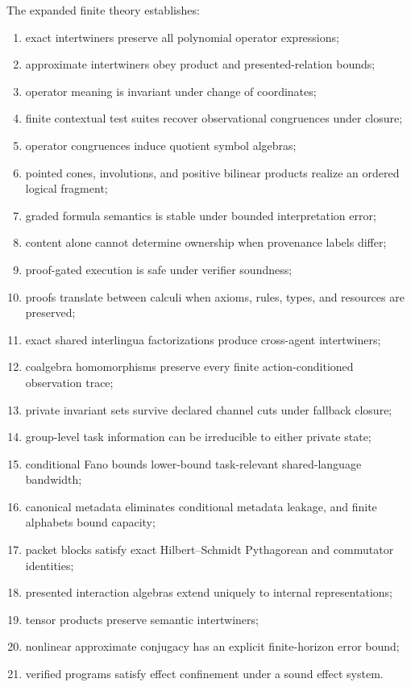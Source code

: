 \documentclass[11pt]{article}
\theoremstyle{definition}
\theoremstyle{remark}
\begin{document}
The expanded finite theory establishes:
\begin{enumerate}[leftmargin=1.7em]
  \item exact intertwiners preserve all polynomial operator expressions;
  \item approximate intertwiners obey product and presented-relation bounds;
  \item operator meaning is invariant under change of coordinates;
  \item finite contextual test suites recover observational congruences under closure;
  \item operator congruences induce quotient symbol algebras;
  \item pointed cones, involutions, and positive bilinear products realize an ordered logical fragment;
  \item graded formula semantics is stable under bounded interpretation error;
  \item content alone cannot determine ownership when provenance labels differ;
  \item proof-gated execution is safe under verifier soundness;
  \item proofs translate between calculi when axioms, rules, types, and resources are preserved;
  \item exact shared interlingua factorizations produce cross-agent intertwiners;
  \item coalgebra homomorphisms preserve every finite action-conditioned observation trace;
  \item private invariant sets survive declared channel cuts under fallback closure;
  \item group-level task information can be irreducible to either private state;
  \item conditional Fano bounds lower-bound task-relevant shared-language bandwidth;
  \item canonical metadata eliminates conditional metadata leakage, and finite alphabets bound capacity;
  \item packet blocks satisfy exact Hilbert--Schmidt Pythagorean and commutator identities;
  \item presented interaction algebras extend uniquely to internal representations;
  \item tensor products preserve semantic intertwiners;
  \item nonlinear approximate conjugacy has an explicit finite-horizon error bound;
  \item verified programs satisfy effect confinement under a sound effect system.
\end{enumerate}
\end{document}
